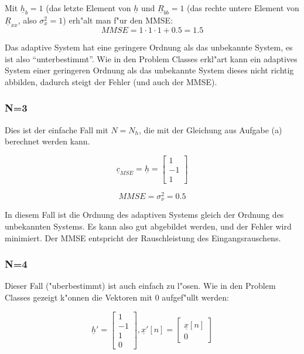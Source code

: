 Mit $\underline{h}_b = 1$ (das letzte Element von $\underline{h}$ und $\underline{R}_{bb} = 1$ (das rechte untere Element von $\underline{R}_{xx}$, also $\sigma_x^2 = 1$) erh"alt man f"ur den MMSE:
\begin{equation}
 MMSE = 1 \cdot 1 \cdot 1 + 0.5 = 1.5
\end{equation}

Das adaptive System hat eine geringere Ordnung als das unbekannte System, es ist also ``unterbestimmt''. Wie in den Problem Classes erkl"art kann ein adaptives System einer geringeren Ordnung als das unbekannte System dieses nicht richtig abbilden, dadurch steigt der Fehler (und auch der MMSE).

\subsubsection{N=3}

Dies ist der einfache Fall mit $N=N_h$, die mit der Gleichung aus Aufgabe (a) berechnet werden kann.

\begin{equation}
 \underline{c}_{MSE} = \underline{h} = \begin{bmatrix} 1 \\ -1 \\ 1 \end{bmatrix}
\end{equation}

\begin{equation}
 MMSE = \sigma_\nu^2 = 0.5
\end{equation}

In diesem Fall ist die Ordnung des adaptiven Systems gleich der Ordnung des unbekannten Systems. Es kann also gut abgebildet werden, und der Fehler wird minimiert. Der MMSE entspricht der Rauschleistung des Eingangsrauschens.


\subsubsection{N=4}

Dieser Fall ("uberbestimmt) ist auch einfach zu l"osen. Wie in den Problem Classes gezeigt k"onnen die Vektoren mit 0 aufgef"ullt werden:

$$ \underline{h}' = \begin{bmatrix} 1 \\ -1 \\ 1 \\ 0 \end{bmatrix}, \underline{x}'[n] = \begin{bmatrix} \underline{x}[n] \\ 0 \end{bmatrix} $$

